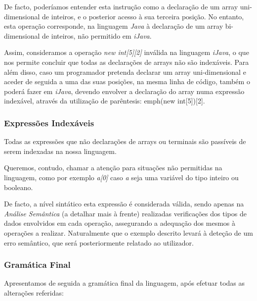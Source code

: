 \documentclass[11pt,a4paper]{article}
\begin{document}
De facto, poderíamos entender esta instrução como a declaração de um array uni-dimensional de inteiros, e o posterior acesso à sua terceira posição. No entanto, esta operação corresponde, na linguagem \emph{Java} à declaração de um array bi-dimensional de inteiros, não permitido em \emph{iJava}.

Assim, consideramos a operação \emph{new int[5][2]} inválida na linguagem \emph{iJava}, o que nos permite concluir que todas as declarações de arrays não são indexáveis. Para além disso, caso um programador pretenda declarar um array uni-dimensional e aceder de seguida a uma das suas posições, na mesma linha de código, também o poderá fazer em \emph{iJava}, devendo envolver a declaração do array numa expressão indexável, através da utilização de parêntesis: emph{(new int[5])[2]}.

\subsubsection{Expressões Indexáveis}

Todas as expressões que não declarações de arrays ou terminais são passíveis de serem indexadas na nossa linguagem.

Queremos, contudo, chamar a atenção para situações não permitidas na linguagem, como por exemplo \emph{a[0]} caso \emph{a} seja uma variável do tipo inteiro ou booleano.

De facto, a nível sintático esta expressão é considerada válida, sendo apenas na \emph{Análise Semântica} (a detalhar mais à frente) realizadas verificações dos tipos de dados envolvidos em cada operação, assegurando a adequação dos mesmos à operações a realizar. Naturalmente que o exemplo descrito levará à deteção de um erro semântico, que será posteriormente relatado ao utilizador.

\subsubsection{Gramática Final}

Apresentamos de seguida a gramática final da linguagem, após efetuar todas as alterações referidas:
\end{document}
